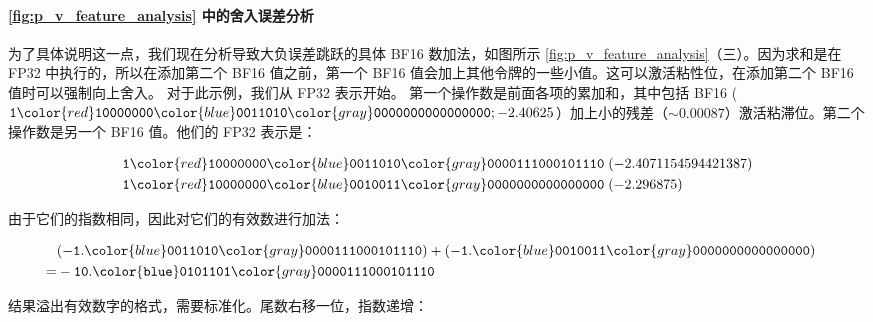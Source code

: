 \documentclass{article} %
\begin{document}
\paragraph{\cref{fig:p_v_feature_analysis} 中的舍入误差分析}
为了具体说明这一点，我们现在分析导致大负误差跳跃的具体 BF16 数加法，如图所示 \cref{fig:p_v_feature_analysis}（三）。因为求和是在 FP32 中执行的，所以在添加第二个 BF16 值之前，第一个 BF16 值会加上其他令牌的一些小值。这可以激活粘性位，在添加第二个 BF16 值时可以强制向上舍入。
对于此示例，我们从 FP32 表示开始。
第一个操作数是前面各项的累加和，其中包括 BF16 ($\mathtt{1}{{\color{red}\mathtt{10000000}}}{{\color{blue}\mathtt{0011010}}}{\color{gray}\mathtt{0000000000000000}}; -2.40625$）加上小的残差（$\sim 0.00087$）激活粘滞位。第二个操作数是另一个 BF16 值。他们的 FP32 表示是：
\begin{tcolorbox}[colback=black!5!white,
  colframe=black,
  boxrule=0.5pt,
  width=0.95\linewidth,
  arc=4pt,
  boxsep=1pt,
  halign=center,
  top=0pt,
  bottom=0.5pt,
  center]
\vspace{-5pt}
\begin{align*}
  \mathtt{1}{\color{red}\mathtt{10000000}}{\color{blue}\mathtt{0011010}}{\color{gray}\mathtt{0000111000101110}} &\; (-2.4071154594421387) \\
  \mathtt{1}{{\color{red}\mathtt{10000000}}}{{\color{blue}\mathtt{0010011}}}{\color{gray}\mathtt{0000000000000000}}&\; (-2.296875)
\end{align*}
\end{tcolorbox}
由于它们的指数相同，因此对它们的有效数进行加法：
\begin{tcolorbox}[colback=black!5!white,
  colframe=black,
  boxrule=0.5pt,
  width=0.95\linewidth,
  arc=4pt,
  boxsep=1pt,
  halign=center,
  top=0pt,
  bottom=0.5pt,
  center]
\vspace{-4pt}
\begin{align*}
  &(\mathtt{-1.}{\color{blue}\mathtt{0011010}}{\color{gray}\mathtt{0000111000101110}})
  + (\mathtt{-1.}{\color{blue}\mathtt{0010011}}{\color{gray}\mathtt{0000000000000000}})& \\
  =& -\mathtt{10.{\color{blue}0101101}}{\color{gray}\mathtt{0000111000101110}}
\end{align*}
\end{tcolorbox}
结果溢出有效数字的格式，需要标准化。尾数右移一位，指数递增：
\end{document}
